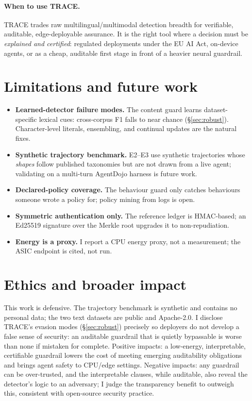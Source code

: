 \documentclass[11pt]{article}
\begin{document}
\paragraph{When to use TRACE.} TRACE trades raw multilingual/multimodal detection
breadth for verifiable, auditable, edge-deployable assurance. It is the right
tool where a decision must be \emph{explained and certified}: regulated
deployments under the EU AI Act, on-device agents, or as a cheap, auditable first
stage in front of a heavier neural guardrail.

\section{Limitations and future work}
\label{sec:limits}
\begin{itemize}[leftmargin=1.4em]
\item \textbf{Learned-detector failure modes.} The content guard learns
dataset-specific lexical cues: cross-corpus F1 falls to near chance
(\S\ref{sec:robust}). Character-level literals, ensembling, and continual updates
are the natural fixes.
\item \textbf{Synthetic trajectory benchmark.} E2--E3 use synthetic trajectories
whose \emph{shapes} follow published taxonomies but are not drawn from a live
agent; validating on a multi-turn AgentDojo harness is future work.
\item \textbf{Declared-policy coverage.} The behaviour guard only catches
behaviours someone wrote a policy for; policy mining from logs is open.
\item \textbf{Symmetric authentication only.} The reference ledger is HMAC-based;
an Ed25519 signature over the Merkle root upgrades it to non-repudiation.
\item \textbf{Energy is a proxy.} I report a CPU energy proxy, not a measurement;
the ASIC endpoint is cited, not run.
\end{itemize}

\section{Ethics and broader impact}
This work is defensive. The trajectory benchmark is synthetic and contains no
personal data; the two text datasets are public and Apache-2.0. I disclose
TRACE's evasion modes (\S\ref{sec:robust}) precisely so deployers do not develop
a false sense of security: an auditable guardrail that is quietly bypassable is
worse than none if mistaken for complete. Positive impacts: a low-energy,
interpretable, certifiable guardrail lowers the cost of meeting emerging
auditability obligations and brings agent safety to CPU/edge settings. Negative
impacts: any guardrail can be over-trusted, and the interpretable clauses, while
auditable, also reveal the detector's logic to an adversary; I judge the
transparency benefit to outweigh this, consistent with open-source security
practice.
\end{document}
